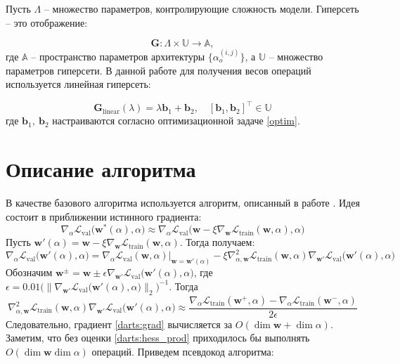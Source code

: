\documentclass[12pt, twoside]{article}
\begin{document}
Пусть $\Lambda$ --  множество параметров, контролирующие сложность модели. Гиперсеть -- это отображение:

\begin{equation}
	\mathbf{G} : \Lambda \times \mathbb{U} \rightarrow \mathbb{A},
\end{equation}
где $\mathbb{A}$ -- пространство параметров архитектуры $\{\alpha^{(i, j)}_o\}$, а $\mathbb{U}$ -- множество параметров гиперсети.
В данной работе для получения весов операций используется линейная гиперсеть:
 
 \begin{equation}\label{hypernet}
 \mathbf{G}_{\text{linear}}(\lambda) = \lambda \mathbf{b}_1 + \mathbf{b}_2, \quad [\mathbf{b}_1, \mathbf{b}_2]^\top \in \mathbb{U}
 \end{equation}
 где $\mathbf{b}_1, ~\mathbf{b}_2$  настраиваются согласно оптимизационной задаче \eqref{optim}.

\section{Описание алгоритма}
 В качестве базового алгоритма используется алгоритм, описанный в работе \cite{journals/corr/abs-1806-09055}. Идея состоит в приближении истинного градиента:
$$\nabla_\alpha\mathcal{L}_\text{val}\bigl(\mathbf{w}^*(\alpha), \alpha\bigr) \approx \nabla_\alpha\mathcal{L}_\text{val} \bigl( \mathbf{w} - \xi\nabla_\mathbf{w}\mathcal{L}_\text{train}(\mathbf{w}, \alpha), \alpha \bigr)$$
Пусть $\mathbf{w}'(\alpha) = \mathbf{w} - \xi\nabla_\mathbf{w}\mathcal{L}_\text{train}(\mathbf{w}, \alpha)$. Тогда получаем:
\begin{equation}
\label{darts:grad}
\nabla_\alpha\mathcal{L}_\text{val}\bigl(\mathbf{w}'(\alpha), \alpha\bigr) = \nabla_\alpha\mathcal{L}_\text{val}(\mathbf{w}, \alpha)\big|_{\mathbf{w} = \mathbf{w}'(\alpha)} - \xi\nabla^2_{\alpha, \mathbf{w}}\mathcal{L}_\text{train}(\mathbf{w}, \alpha)\nabla_\mathbf{w'}\mathcal{L}_\text{val}\bigl(\mathbf{w}'(\alpha), \alpha\bigr)
\end{equation}
Обозначим $\mathbf{w}^{\pm} = \mathbf{w}\pm\epsilon\nabla_\mathbf{w'}\mathcal{L}_\text{val}\bigl(\mathbf{w}'(\alpha), \alpha\bigr)$, где $\epsilon = 0.01\bigl(\|\nabla_\mathbf{w'}\mathcal{L}_\text{val}\bigl(\mathbf{w}'(\alpha), \alpha\bigr)\|_2\bigr)^{-1}$.
Тогда
\begin{equation}
\label{darts:hess_prod}
\nabla^2_{\alpha, \mathbf{w}}\mathcal{L}_\text{train}(\mathbf{w}, \alpha)\nabla_\mathbf{w'}\mathcal{L}_\text{val}\bigl(\mathbf{w}'(\alpha), \alpha\bigr) \approx \frac{\nabla_\alpha\mathcal{L}_\text{train}(\mathbf{w}^+, \alpha) - \nabla_\alpha\mathcal{L}_\text{train}(\mathbf{w}^-, \alpha)}{2\epsilon}
\end{equation}
Следовательно, градиент \eqref{darts:grad} вычисляется за $O(\dim\mathbf{w} + \dim\alpha)$. Заметим, что без оценки \eqref{darts:hess_prod} приходилось бы выполнять $O(\dim\mathbf{w}\dim\alpha)$ операций. Приведем псевдокод алгоритма:
\end{document}
